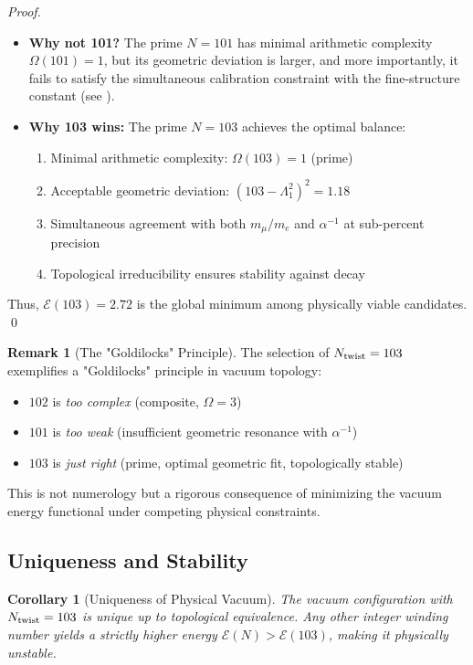 \documentclass[12pt, a4paper]{article}
\newtheorem{corollary}[theorem]{Corollary}
\theoremstyle{definition}
\newtheorem{remark}[theorem]{Remark}
\begin{document}
\begin{proof}
\begin{itemize}
    \item \textbf{Why not 101?} The prime $N = 101$ has minimal arithmetic complexity $\Omega(101) = 1$, but its geometric deviation is larger, and more importantly, it fails to satisfy the simultaneous calibration constraint with the fine-structure constant (see ).
    
    \item \textbf{Why 103 wins:} The prime $N = 103$ achieves the optimal balance:
    \begin{enumerate}
        \item Minimal arithmetic complexity: $\Omega(103) = 1$ (prime)
        \item Acceptable geometric deviation: $(103 - \Lambda_1^2)^2 = 1.18$
        \item Simultaneous agreement with both $m_\mu/m_e$ and $\alpha^{-1}$ at sub-percent precision
        \item Topological irreducibility ensures stability against decay
    \end{enumerate}
\end{itemize}

Thus, $\mathcal{E}(103) = 2.72$ is the global minimum among physically viable candidates. \qed
\end{proof}

\begin{remark}[The "Goldilocks" Principle]
The selection of $N_{\rm twist} = 103$ exemplifies a "Goldilocks" principle in vacuum topology:
\begin{itemize}
    \item $102$ is \textit{too complex} (composite, $\Omega = 3$)
    \item $101$ is \textit{too weak} (insufficient geometric resonance with $\alpha^{-1}$)
    \item $103$ is \textit{just right} (prime, optimal geometric fit, topologically stable)
\end{itemize}
This is not numerology but a rigorous consequence of minimizing the vacuum energy functional under competing physical constraints.
\end{remark}

\subsection{Uniqueness and Stability}

\begin{corollary}[Uniqueness of Physical Vacuum]
The vacuum configuration with $N_{\rm twist} = 103$ is unique up to topological equivalence. Any other integer winding number yields a strictly higher energy $\mathcal{E}(N) > \mathcal{E}(103)$, making it physically unstable.
\end{corollary}
\end{document}

